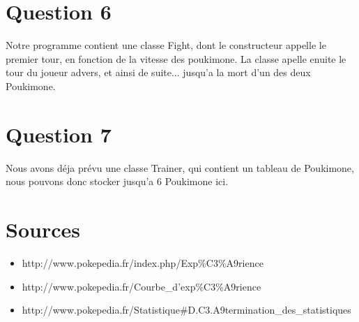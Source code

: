 \documentclass{report}
\begin{document}
\section*{Question 6}
Notre programme contient une classe Fight, dont le constructeur appelle le premier tour, en fonction de la vitesse des poukimone. La classe apelle enuite le tour du joueur advers, et ainsi de suite... jusqu'a la mort d'un des deux Poukimone.

\section*{Question 7}
Nous avons déja prévu une classe Trainer, qui contient un tableau de Poukimone, nous pouvons donc stocker jusqu'a 6 Poukimone ici.
\newpage
\section*{Sources}
\begin{itemize}
    \item{http://www.pokepedia.fr/index.php/Exp\%C3\%A9rience}\\
    \item{http://www.pokepedia.fr/Courbe\_d'exp\%C3\%A9rience}\\
    \item{http://www.pokepedia.fr/Statistique\#D.C3.A9termination\_des\_statistiques}
\end{itemize}
\end{document}
